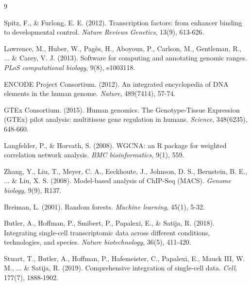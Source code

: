 \documentclass[11pt,a4paper]{article}
\begin{document}

\begin{thebibliography}{9}

Spitz, F., \& Furlong, E. E. (2012). Transcription factors: from enhancer binding to developmental control. \textit{Nature Reviews Genetics}, 13(9), 613-626.

Lawrence, M., Huber, W., Pagès, H., Aboyoun, P., Carlson, M., Gentleman, R., ... \& Carey, V. J. (2013). Software for computing and annotating genomic ranges. \textit{PLoS computational biology}, 9(8), e1003118.

ENCODE Project Consortium. (2012). An integrated encyclopedia of DNA elements in the human genome. \textit{Nature}, 489(7414), 57-74.

GTEx Consortium. (2015). Human genomics. The Genotype-Tissue Expression (GTEx) pilot analysis: multitissue gene regulation in humans. \textit{Science}, 348(6235), 648-660.

Langfelder, P., \& Horvath, S. (2008). WGCNA: an R package for weighted correlation network analysis. \textit{BMC bioinformatics}, 9(1), 559.

Zhang, Y., Liu, T., Meyer, C. A., Eeckhoute, J., Johnson, D. S., Bernstein, B. E., ... \& Liu, X. S. (2008). Model-based analysis of ChIP-Seq (MACS). \textit{Genome biology}, 9(9), R137.

Breiman, L. (2001). Random forests. \textit{Machine learning}, 45(1), 5-32.

Butler, A., Hoffman, P., Smibert, P., Papalexi, E., \& Satija, R. (2018). Integrating single-cell transcriptomic data across different conditions, technologies, and species. \textit{Nature biotechnology}, 36(5), 411-420.

Stuart, T., Butler, A., Hoffman, P., Hafemeister, C., Papalexi, E., Mauck III, W. M., ... \& Satija, R. (2019). Comprehensive integration of single-cell data. \textit{Cell}, 177(7), 1888-1902.

\end{thebibliography}
\end{document}
